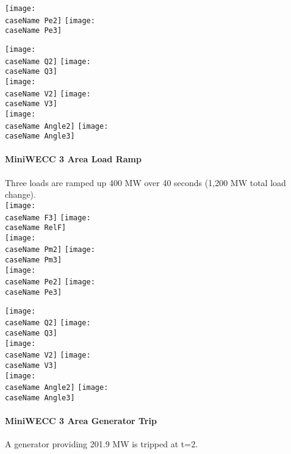 \documentclass[12pt]{article}
\newcommand{\caseName}{ }
\begin{document}
	\texttt{[image: \\caseName Pe2]} %
	\texttt{[image: \\caseName Pe3]} 
	
	\pagebreak

	\texttt{[image: \\caseName Q2]} %
	\texttt{[image: \\caseName Q3]} \\

	\texttt{[image: \\caseName V2]} %
	\texttt{[image: \\caseName V3]} \\

	\texttt{[image: \\caseName Angle2]} %
	\texttt{[image: \\caseName Angle3]} 

\pagebreak
\renewcommand{\caseName}{miniWECC3ALTDramp}
\paragraph{MiniWECC 3 Area Load Ramp} Three loads are ramped up 400 MW over 40 seconds (1,200 MW total load change).\\

	\texttt{[image: \\caseName F3]} %
	\texttt{[image: \\caseName RelF]} \\

	\texttt{[image: \\caseName Pm2]} %
	\texttt{[image: \\caseName Pm3]} \\

	\texttt{[image: \\caseName Pe2]} %
	\texttt{[image: \\caseName Pe3]} 
	
	\pagebreak

	\texttt{[image: \\caseName Q2]} %
	\texttt{[image: \\caseName Q3]} \\

	\texttt{[image: \\caseName V2]} %
	\texttt{[image: \\caseName V3]} \\

	\texttt{[image: \\caseName Angle2]} %
	\texttt{[image: \\caseName Angle3]} 
	
\pagebreak
\renewcommand{\caseName}{miniWECCgenTrip027}
\paragraph{MiniWECC 3 Area  Generator Trip} A generator providing 201.9 MW is tripped at t=2.\\
\end{document}
